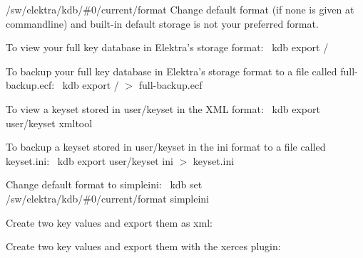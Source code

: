 \begin{DoxyItemize}
\item {\ttfamily /sw/elektra/kdb/\#0/current/format} Change default format (if none is given at commandline) and built-\/in default {\ttfamily storage} is not your preferred format.
\end{DoxyItemize}

To view your full key database in Elektra’s {\ttfamily storage} format\+:~\newline
 {\ttfamily kdb export /}~\newline


To backup your full key database in Elektra’s {\ttfamily storage} format to a file called {\ttfamily full-\/backup.\+ecf}\+:~\newline
 {\ttfamily kdb export / $>$ full-\/backup.\+ecf}~\newline


To view a keyset stored in {\ttfamily user/keyset} in the X\+ML format\+:~\newline
 {\ttfamily kdb export user/keyset xmltool}~\newline


To backup a keyset stored in {\ttfamily user/keyset} in the {\ttfamily ini} format to a file called {\ttfamily keyset.\+ini}\+:~\newline
 {\ttfamily kdb export user/keyset ini $>$ keyset.\+ini}~\newline


Change default format to {\ttfamily simpleini}\+:~\newline
 {\ttfamily kdb set /sw/elektra/kdb/\#0/current/format simpleini}

Create two key values and export them as {\ttfamily xml}\+:


\begin{DoxyCode}{0}
\DoxyCodeLine{}
\DoxyCodeLine{\#>}
\DoxyCodeLine{\#>}
\DoxyCodeLine{\#>}
\DoxyCodeLine{}
\DoxyCodeLine{}
\end{DoxyCode}


Create two key values and export them with the {\ttfamily xerces} plugin\+:


